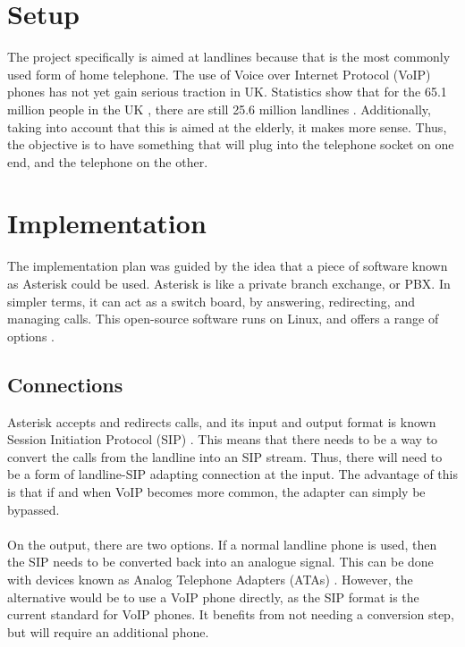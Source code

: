 \documentclass[12pt,a4paper]{report}
\begin{document}
\section{Setup}
The project specifically is aimed at landlines because that is the most commonly used form of home telephone. The use of Voice over Internet Protocol (VoIP) phones has not yet gain serious traction in UK. Statistics show that for the 65.1 million people in the UK \cite{ons}, there are still 25.6 million landlines \cite{ofcom}. Additionally, taking into account that this is aimed at the elderly, it makes more sense. Thus, the objective is to have something that will plug into the telephone socket on one end, and the telephone on the other.

\section{Implementation}
The implementation plan was guided by the idea that a piece of software known as Asterisk could be used. Asterisk is like a private branch exchange, or PBX. In simpler terms, it can act as a switch board, by answering, redirecting, and managing calls. This open-source software runs on Linux, and offers a range of options \cite{asterisk}.

\subsection{Connections}
Asterisk accepts and redirects calls, and its input and output format is known Session Initiation Protocol (SIP) \cite{sip}. This means that there needs to be a way to convert the calls from the landline into an SIP stream. Thus, there will need to be a form of landline-SIP adapting connection at the input. The advantage of this is that if and when VoIP becomes more common, the adapter can simply be bypassed.
\\\\
On the output, there are two options. If a normal landline phone is used, then the SIP needs to be converted back into an analogue signal. This can be done with devices known as Analog Telephone Adapters (ATAs) \cite{ata}. However, the alternative would be to use a VoIP phone directly, as the SIP format is the current standard for VoIP phones. It benefits from not needing a conversion step, but will require an additional phone.
\end{document}
